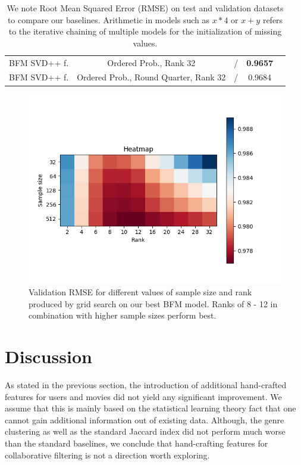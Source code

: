 \documentclass[10pt,conference,compsocconf]{IEEEtran}
\begin{document}
\begin{table}
{\begin{tabular}{|| c | c | c | c | c ||}
                BFM SVD++ f.         & Ordered Prob., Rank 32                & /                       & \textbf{ 0.9657 }      &                         \\
                BFM SVD++ f.         & Ordered Prob., Round Quarter, Rank 32 & /                       & 0.9684                 &                         \\
                \hline
            \end{tabular}
        }
        \caption{We note Root Mean Squared Error (RMSE) on test and validation datasets to compare our baselines.
        Arithmetic in models such as $x * 4$ or $x + y$ refers to the iterative chaining of multiple models for the initialization of missing values.
        }
        \label{tab:ablation}
    \end{table}


    \begin{figure}
        \includegraphics[width=\columnwidth]{figures/heatmap.png}
        \caption{Validation RMSE for different values of sample size and rank produced by grid search on our best BFM model.
        Ranks of 8 - 12 in combination with higher sample sizes perform best.}
        \label{fig:Heatmap}
    \end{figure}


    \section{Discussion}
    As stated in the previous section, the introduction of additional hand-crafted features for users and movies did not yield any significant improvement.
    We assume that this is mainly based on the statistical learning theory fact that one cannot gain additional information out of existing data.
    Although, the genre clustering as well as the standard Jaccard index did not perform much worse than the standard baselines, we conclude that hand-crafting features for collaborative filtering is not a direction worth exploring.
\end{document}
